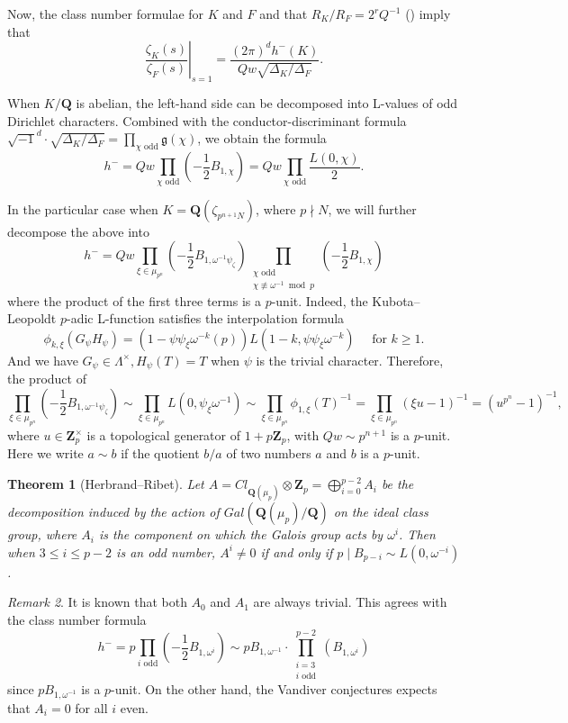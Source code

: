 \documentclass[leqno]{amsart}
\newtheorem{thm}{Theorem}[section]
\theoremstyle{definition}
\theoremstyle{remark}
\newtheorem{rem}[thm]{Remark}
\newcommand{\Q}{{\mathbf{Q}}}
\newcommand{\Zp}{\mathbf{Z}_p}
\newcommand{\F}{{{F}}} %
\newcommand{\K}{{{K}}} %
\begin{document}
Now, the class number formulae for $\K$ and $\F$ 
and that $R_\K/R_\F=2^r Q^{-1}$ (\cite[Thm 4.16]{Washington})
imply that
\[
	\left.\frac{\zeta_\K(s)}{\zeta_\F(s)}\right\vert_{s=1}=
	\frac{(2\pi)^{d}h^-(\K)}{Qw\sqrt{\Delta_\K/\Delta_\F}}.
\]

When $\K/\Q$ is abelian, 
the left-hand side can be decomposed into L-values
of odd Dirichlet characters.
Combined with the conductor-discriminant formula
$\sqrt{-1}^d\cdot \sqrt{\Delta_\K/\Delta_\F}
=\prod_{\chi \text{ odd}}\mathfrak{g}(\chi)$,
we obtain the formula
\[
	h^-=Qw\prod_{\chi \text{ odd}}(-\frac{1}{2}B_{1,\chi})
	=Qw\prod_{\chi \text{ odd}}\frac{L(0,\chi)}{2}.
\]

In the particular case when 
$\K=\Q(\zeta_{p^{n+1}N})$, where $p\nmid N$,
we will further decompose the above into
\[
	h^-
	=Qw\prod_{\xi\in \mu_{p^n}}(-\frac{1}{2}B_{1,\omega^{-1}\psi_\zeta})
	\prod_{\substack{\chi \text{ odd}\\\chi\not\equiv \omega^{-1}\bmod p}}
	(-\frac{1}{2}B_{1,\chi})
\]
where the product of the first three terms is a $p$-unit.
Indeed, the Kubota--Leopoldt $p$-adic L-function
satisfies the interpolation formula
\[
	\phi_{k,\xi}(G_{\psi}H_{\psi})=
	(1-\psi \psi_\xi \omega^{-k}(p))
	L(1-k,\psi \psi_\xi \omega^{-k})\quad
	\text{ for }k\geq 1.
\]
And we have $G_\psi\in \Lambda^\times, H_\psi(T)=T$
when $\psi$ is the trivial character.
Therefore, the product of
\[
	\prod_{\xi\in \mu_{p^n}}(-\frac{1}{2}B_{1,\omega^{-1}\psi_\zeta})
	\sim \prod_{\xi\in \mu_{p^n}}L(0,\psi_\xi \omega^{-1})
	\sim \prod_{\xi\in \mu_{p^n}}\phi_{1,\xi}(T)^{-1}
	=\prod_{\xi\in \mu_{p^n}}(\xi u-1)^{-1}
	=(u^{p^n}-1)^{-1},
\]
where $u\in \Zp^\times$ is a topological generator of $1+p\Zp$,
with $Qw\sim p^{n+1}$ is a $p$-unit.
Here we write $a\sim b$ if the quotient $b/a$ of two numbers
$a$ and $b$ is a $p$-unit.

\begin{thm}[Herbrand--Ribet]
	Let $A=Cl_{\Q(\mu_p)}\otimes\Zp=\bigoplus_{i=0}^{p-2}A_{i}$
	be the decomposition 
	induced by the action of $Gal(\Q(\mu_p)/\Q)$
	on the ideal class group,
	where $A_i$ is the component on which 
	the Galois group acts by $\omega^i$.
	Then when $3\leq i\leq p-2$ is an odd number,
	$A^i\neq 0$ if and only if  
	$p\mid B_{p-i}\sim L(0,\omega^{-i})$.
\end{thm}

\begin{rem}
	It is known that both $A_0$ and $A_1$ are always trivial.
	This agrees with the class number formula
\[
	h^-=p\prod_{i \text{ odd}}(-\frac{1}{2}B_{1,\omega^{i}})
	\sim pB_{1,\omega^{-1}}\cdot
	\prod_{\substack{i=3 \\i\text{ odd}}}^{p-2}(B_{1,\omega^{i}})
\]
since $pB_{1,\omega^{-1}}$ is a $p$-unit.
On the other hand, the Vandiver conjectures expects that 
$A_i=0$ for all $i$ even.
\end{rem}
\end{document}

